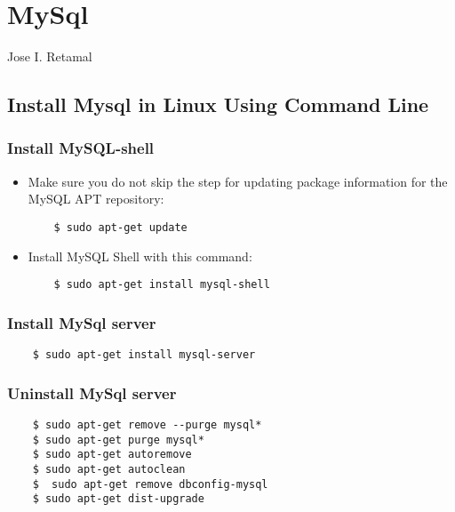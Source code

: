 \chapter{MySql}{Jose I. Retamal }


\section{Install Mysql in Linux Using Command Line}	


\subsection{Install MySQL-shell}

\begin{itemize}
	
\item Make sure you do not skip the step for updating package information for the MySQL APT repository: 
	
	\begin{verbatim}
	$ sudo apt-get update
	\end{verbatim}
	
	\item Install MySQL Shell with this command: 
	
	\begin{verbatim}
	$ sudo apt-get install mysql-shell
	\end{verbatim}
\end{itemize}

\subsection{Install MySql server}

\begin{itemize}
	

	
	\begin{verbatim}
	$ sudo apt-get install mysql-server
	\end{verbatim}
	

\end{itemize}

\subsection{Uninstall MySql server}

\begin{itemize}
	
	
	
	\begin{verbatim}
	$ sudo apt-get remove --purge mysql*
	$ sudo apt-get purge mysql*
	$ sudo apt-get autoremove
	$ sudo apt-get autoclean
	$  sudo apt-get remove dbconfig-mysql
	$ sudo apt-get dist-upgrade
	\end{verbatim}
	
	
\end{itemize}

